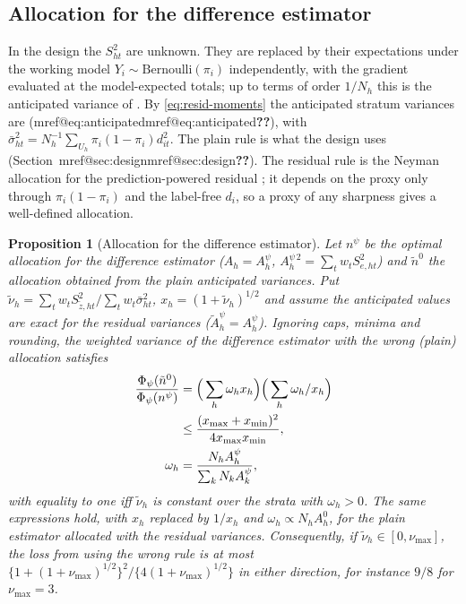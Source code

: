 \documentclass[pdflatex,sn-mathphys-num,iicol]{sn-jnl}
\makeatletter
\theoremstyle{thmstyleone}
\newtheorem{proposition}{Proposition}
\theoremstyle{thmstyletwo}
\theoremstyle{thmstylethree}
\newcommand{\Mref}[1]{\ifcsname mref@#1\endcsname\csname mref@#1\endcsname\else\textbf{??}\fi}
\makeatother
\begin{document}
\subsection{Allocation for the difference estimator}\label{si:theory-alloc}


In the design the $S^2_{ht}$ are unknown. They are replaced by their expectations under the
working model $Y_i\sim\text{Bernoulli}(\pi_i)$ independently, with the gradient evaluated at the
model-expected totals; up to terms of order $1/N_h$ this is the anticipated variance of
\citet{isaki1982}. By \eqref{eq:resid-moments} the anticipated stratum variances are (\Mref{eq:anticipated}), with
$\bar\sigma^2_{ht}=N_h^{-1}\sum_{U_h}\pi_i(1-\pi_i)d_{it}^2$. The plain rule is what the design uses (Section~\Mref{sec:design}). The residual rule is the Neyman allocation for the prediction-powered residual
\citep{fisch2024stratppi}; it depends on the proxy only through $\pi_i(1-\pi_i)$ and the label-free $d_i$, so a proxy of any
sharpness gives a well-defined allocation.

\begin{proposition}[Allocation for the difference estimator]\label{prop:alloc-dif}
Let $n^\psi$ be the optimal allocation for the difference estimator ($A_h=A^\psi_h$, $A^{\psi\,2}_h=\sum_tw_tS^2_{e,ht}$) and $\tilde n^0$ the allocation obtained from the
plain anticipated variances. Put $\tilde\nu_h=\sum_tw_tS^2_{\tilde z,ht}/\sum_tw_t\bar\sigma^2_{ht}$, $x_h=(1+\tilde\nu_h)^{1/2}$ and assume the anticipated values are exact for the
residual variances ($\tilde A^\psi_h=A^\psi_h$). Ignoring caps, minima and rounding, the weighted variance of the difference estimator with the \emph{wrong} (plain) allocation satisfies
\begin{align}
\frac{\Phi_\psi(\tilde n^0)}{\Phi_\psi(n^\psi)}&=\Big(\sum_h\omega_hx_h\Big)\Big(\sum_h\omega_h/x_h\Big)\notag\\
&\le\frac{(x_{\max}+x_{\min})^2}{4x_{\max}x_{\min}},\notag\\
\omega_h&=\frac{N_hA^\psi_h}{\sum_kN_kA^\psi_k},\label{eq:alloc-loss}
\end{align}
with equality to one iff $\tilde\nu_h$ is constant over the strata with $\omega_h>0$. The same expressions hold, with $x_h$ replaced by $1/x_h$ and
$\omega_h\propto N_hA^0_h$, for the plain estimator allocated with the residual variances. Consequently, if $\tilde\nu_h\in[0,\nu_{\max}]$, the loss from
using the wrong rule is at most $\{1+(1+\nu_{\max})^{1/2}\}^2/\{4(1+\nu_{\max})^{1/2}\}$ in either direction, for instance $9/8$ for $\nu_{\max}=3$.
\end{proposition}
\end{document}
